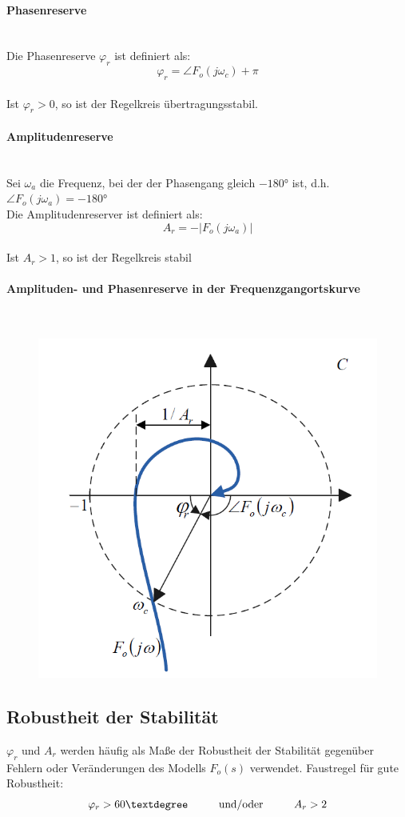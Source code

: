 \documentclass[10pt,a4paper]{article}
\newcommand{\tab}[1][1]{\hspace*{#1cm}}
\begin{document}
\paragraph{Phasenreserve} ~\\
Die Phasenreserve $\varphi_r$ ist definiert als:
$$
	\varphi_r = \angle F_o(j \omega_c) + \pi
$$ \\

Ist $\varphi_r > 0$, so ist der Regelkreis übertragungsstabil.

\paragraph{Amplitudenreserve} ~\\
Sei $\omega_a$ die Frequenz, bei der der Phasengang gleich $-180°$ ist, d.h. $\angle F_o(j \omega_a) = -180°$ \\
Die Amplitudenreserver ist definiert als:
$$
	A_r = -|F_o(j \omega_a)|
$$ \\

Ist $A_r > 1$, so ist der Regelkreis stabil

\paragraph{Amplituden- und Phasenreserve in der Frequenzgangortskurve} ~\\
\begin{figure}[H]
	\includegraphics[width = 0.4\columnwidth]{imgs/nyquist_ortskurve.png}
\end{figure}

\subsection{Robustheit der Stabilität}
$\varphi_r$ und $A_r$ werden häufig als Maße der Robustheit der Stabilität gegenüber Fehlern oder Veränderungen des Modells $F_o(s)$ verwendet. Faustregel für gute Robustheit:
$$
	\varphi_r > 60° \tab \text{und/oder} \tab A_r > 2
$$ \\
\end{document}
